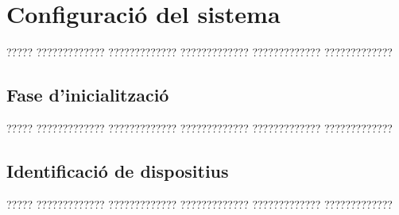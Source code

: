 
\chapter{Configuració del sistema}

????? ????????????? ????????????? ????????????? ????????????? ?????????????

\section{Fase d'inicialització}

????? ????????????? ????????????? ????????????? ????????????? ?????????????

\section{Identificació de dispositius}

????? ????????????? ????????????? ????????????? ????????????? ?????????????

